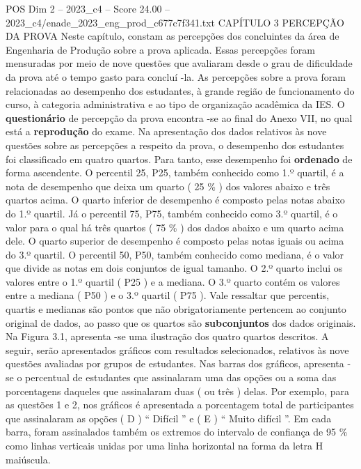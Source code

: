 \begin{textsample}{POS Dim 2 – 2023\_c4 – Score 24.00 – 2023\_c4/enade\_2023\_eng\_prod\_c677c7f341.txt}  \label{ex:f2_pos_005}
CAPÍTULO 3 PERCEPÇÃO DA PROVA Neste capítulo, constam as percepções dos concluintes da área de Engenharia de Produção sobre a prova aplicada.
Essas percepções foram mensuradas por meio de nove questões que avaliaram desde o grau de dificuldade da prova até o tempo gasto para concluí -la.
As percepções sobre a prova foram relacionadas ao desempenho dos estudantes, à grande região de funcionamento do curso, à categoria administrativa e ao tipo de organização acadêmica da IES.
O \textbf{questionário} de percepção da prova encontra -se ao final do Anexo VII, no qual está a \textbf{reprodução} do exame.
Na apresentação dos dados relativos às nove questões sobre as percepções a respeito da prova, o desempenho dos estudantes foi classificado em quatro quartos.
Para tanto, esse desempenho foi \textbf{ordenado} de forma ascendente.
O percentil 25, P25, também conhecido como 1.º quartil, é a nota de desempenho que deixa um quarto ( 25 \% ) dos valores abaixo e três quartos acima.
O quarto inferior de desempenho é composto pelas notas abaixo do 1.º quartil.
Já o percentil 75, P75, também conhecido como 3.º quartil, é o valor para o qual há três quartos ( 75 \% ) dos dados abaixo e um quarto acima dele.
O quarto superior de desempenho é composto pelas notas iguais ou acima do 3.º quartil.
O percentil 50, P50, também conhecido como mediana, é o valor que divide as notas em dois conjuntos de igual tamanho.
O 2.º quarto inclui os valores entre o 1.º quartil ( P25 ) e a mediana.
O 3.º quarto contém os valores entre a mediana ( P50 ) e o 3.º quartil ( P75 ).
Vale ressaltar que percentis, quartis e medianas são pontos que não obrigatoriamente pertencem ao conjunto original de dados, ao passo que os quartos são \textbf{subconjuntos} dos dados originais.
Na Figura 3.1, apresenta -se uma ilustração dos quatro quartos descritos.
A seguir, serão apresentados gráficos com resultados selecionados, relativos às nove questões avaliadas por grupos de estudantes.
Nas barras dos gráficos, apresenta -se o percentual de estudantes que assinalaram uma das opções ou a soma das porcentagens daqueles que assinalaram duas ( ou três ) delas.
Por exemplo, para as questões 1 e 2, nos gráficos é apresentada a porcentagem total de participantes que assinalaram as opções ( D ) “ Difícil ” e ( E ) “ Muito difícil ”.
Em cada barra, foram assinalados também os extremos do intervalo de confiança de 95 \% como linhas verticais unidas por uma linha horizontal na forma da letra H maiúscula.

\end{textsample}
